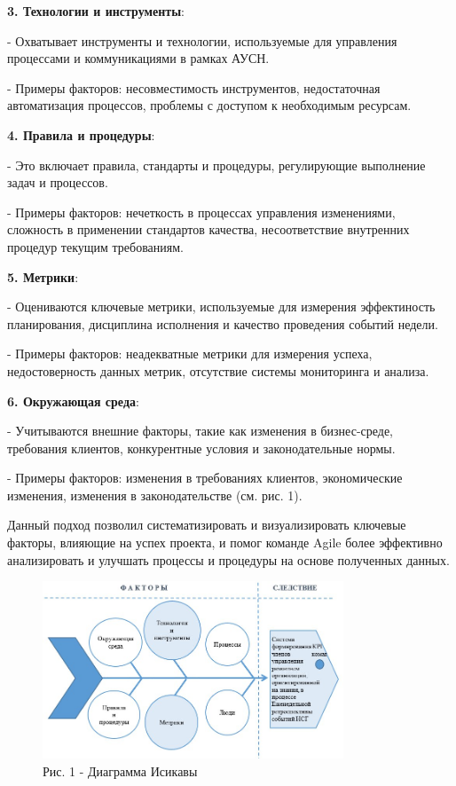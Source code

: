 \begin{multicols}{2}
{\bfseries 3. Технологии и инструменты}:

-  Охватывает инструменты и технологии, используемые для управления
  процессами и коммуникациями в рамках АУСН.

-  Примеры факторов: несовместимость инструментов, недостаточная
  автоматизация процессов, проблемы с доступом к необходимым ресурсам.

{\bfseries 4. Правила и процедуры}:

-  Это включает правила, стандарты и процедуры, регулирующие выполнение
  задач и процессов.

-  Примеры факторов: нечеткость в процессах управления изменениями,
  сложность в применении стандартов качества, несоответствие внутренних
  процедур текущим требованиям.

{\bfseries 5. Метрики}:

-  Оцениваются ключевые метрики, используемые для измерения эффектиность
  планирования, дисциплина исполнения и качество проведения событий
  недели.

-  Примеры факторов: неадекватные метрики для измерения успеха,
  недостоверность данных метрик, отсутствие системы мониторинга и
  анализа.

{\bfseries 6. Окружающая среда}:

-  Учитываются внешние факторы, такие как изменения в бизнес-среде,
  требования клиентов, конкурентные условия и законодательные нормы.

-  Примеры факторов: изменения в требованиях клиентов, экономические
  изменения, изменения в законодательстве (см. рис. 1).

  Данный подход позволил систематизировать и визуализировать ключевые
  факторы, влияющие на успех проекта, и помог команде Agile более
  эффективно анализировать и улучшать процессы и процедуры на основе
  полученных данных. 

\end{multicols}

\begin{figure}[H]
	\centering
	\includegraphics[width=0.8\textwidth]{media/ekon/image3.1}
	\caption*{Рис. 1 - Диаграмма Исикавы}
\end{figure}

